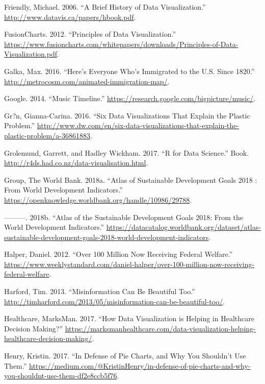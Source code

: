 \documentclass[]{book}
\theoremstyle{definition}
\theoremstyle{definition}
\theoremstyle{definition}
\theoremstyle{remark}
\begin{document}
\hypertarget{ref-data_viz_history}{}
Friendly, Michael. 2006. ``A Brief History of Data Visualization.''
\url{http://www.datavis.ca/papers/hbook.pdf}.

\hypertarget{ref-principles-fusioncharts}{}
FusionCharts. 2012. ``Principles of Data Visualization.''
\url{https://www.fusioncharts.com/whitepapers/downloads/Principles-of-Data-Visualization.pdf}.

\hypertarget{ref-immigration}{}
Galka, Max. 2016. ``Here's Everyone Who's Immigrated to the U.S. Since
1820.'' \url{http://metrocosm.com/animated-immigration-map/}.

\hypertarget{ref-google_music}{}
Google. 2014. ``Music Timeline.''
\url{https://research.google.com/bigpicture/music/}.

\hypertarget{ref-plastic_pollution_visualizations}{}
Gr?n, Gianna-Carina. 2016. ``Six Data Visualizations That Explain the
Plastic Problem.''
\url{http://www.dw.com/en/six-data-visualizations-that-explain-the-plastic-problem/a-36861883}.

\hypertarget{ref-Grammar_Graphics}{}
Grolemund, Garrett, and Hadley Wickham. 2017. ``R for Data Science.''
Book. \url{http://r4ds.had.co.nz/data-visualisation.html}.

\hypertarget{ref-worldbankpub}{}
Group, The World Bank. 2018a. ``Atlas of Sustainable Development Goals
2018 : From World Development Indicators.''
\url{https://openknowledge.worldbank.org/handle/10986/29788}.

\hypertarget{ref-data_access}{}
---------. 2018b. ``Atlas of the Sustainable Development Goals 2018:
From the World Development Indicators.''
\url{https://datacatalog.worldbank.org/dataset/atlas-sustainable-development-goals-2018-world-development-indicators}.

\hypertarget{ref-halper_2012}{}
Halper, Daniel. 2012. ``Over 100 Million Now Receiving Federal
Welfare.''
\url{https://www.weeklystandard.com/daniel-halper/over-100-million-now-receiving-federal-welfare}.

\hypertarget{ref-harford-misinformation}{}
Harford, Tim. 2013. ``Misinformation Can Be Beautiful Too.''
\url{http://timharford.com/2013/05/misinformation-can-be-beautiful-too/}.

\hypertarget{ref-marksman}{}
Healthcare, MarksMan. 2017. ``How Data Visualization is Helping in
Healthcare Decision Making?''
\url{https://marksmanhealthcare.com/data-visualization-helping-healthcare-decision-making/}.

\hypertarget{ref-henry-defense-pie}{}
Henry, Kristin. 2017. ``In Defense of Pie Charts, and Why You Shouldn't
Use Them.''
\url{https://medium.com/@KristinHenry/in-defense-of-pie-charts-and-why-you-shouldnt-use-them-df2e8ccb5f76}.
\end{document}
